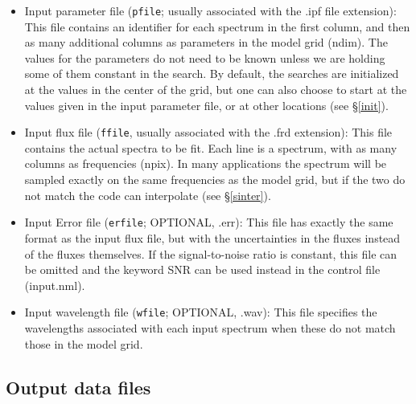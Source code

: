 \documentclass[12pt]{article}
\begin{document}
\begin{itemize}

\item Input parameter file ({\tt pfile}; usually associated with the .ipf file extension): 
This file contains an identifier for each spectrum in the first column, and then as many 
additional columns as parameters in the model grid (ndim). The values for the parameters 
do not need to be known unless
we are holding some of them constant in the search. By default, the searches are
initialized at the values in the center of the grid, but one can also choose 
to start at the values given in the input parameter file, or at other locations 
(see \S \ref{init}).

\item Input flux file ({\tt ffile}, usually associated with the .frd extension): This file 
contains the actual spectra to be fit. Each line is a spectrum, with as
many columns as frequencies (npix). In many applications the spectrum will 
be sampled exactly on the same frequencies as the model grid, but if the two
do not match the code can interpolate (see \S \ref{sinter}).

\item Input Error file ({\tt erfile}; OPTIONAL, .err): This file has exactly the same format as the 
input flux file, but with the uncertainties in the fluxes instead of the fluxes themselves. 
If the signal-to-noise ratio is constant, this file can be omitted and the keyword SNR 
can be used instead in the control file (input.nml).

\item Input wavelength file ({\tt wfile}; OPTIONAL, .wav): This file specifies the wavelengths 
associated with each input spectrum when these do not match
those in the model grid.

\end{itemize}

\subsection{Output data files}
\label{output}
\end{document}
